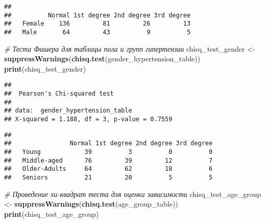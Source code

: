 \documentclass[
]{article}
\newenvironment{Shaded}{\begin{snugshade}}{\end{snugshade}}
\newcommand{\CommentTok}[1]{\textcolor[rgb]{0.56,0.35,0.01}{\textit{#1}}}
\newcommand{\FunctionTok}[1]{\textcolor[rgb]{0.13,0.29,0.53}{\textbf{#1}}}
\newcommand{\NormalTok}[1]{#1}
\newcommand{\OtherTok}[1]{\textcolor[rgb]{0.56,0.35,0.01}{#1}}
\newcommand{\SpecialCharTok}[1]{\textcolor[rgb]{0.81,0.36,0.00}{\textbf{#1}}}
\begin{document}
\begin{verbatim}
##         
##          Normal 1st degree 2nd degree 3rd degree
##   Female    136         81         26         13
##   Male       64         43          9          5
\end{verbatim}

\begin{Shaded}
\begin{Highlighting}[]
\CommentTok{\# Теста Фишера для таблицы пола и групп гипертензии}
\NormalTok{chisq\_test\_gender }\OtherTok{\textless{}{-}} \FunctionTok{suppressWarnings}\NormalTok{(}\FunctionTok{chisq.test}\NormalTok{(gender\_hypertension\_table))}
\FunctionTok{print}\NormalTok{(chisq\_test\_gender)}
\end{Highlighting}
\end{Shaded}

\begin{verbatim}
## 
##  Pearson's Chi-squared test
## 
## data:  gender_hypertension_table
## X-squared = 1.188, df = 3, p-value = 0.7559
\end{verbatim}

\begin{Shaded}
\end{Shaded}

\begin{verbatim}
##               
##                Normal 1st degree 2nd degree 3rd degree
##   Young            39          3          0          0
##   Middle-aged      76         39         12          7
##   Older-Adults     64         62         18          6
##   Seniors          21         20          5          5
\end{verbatim}

\begin{Shaded}
\begin{Highlighting}[]
\CommentTok{\# Проведение хи{-}квадрат теста для оценки зависимости}
\NormalTok{chisq\_test\_age\_group }\OtherTok{\textless{}{-}} \FunctionTok{suppressWarnings}\NormalTok{(}\FunctionTok{chisq.test}\NormalTok{(age\_group\_table))}
\FunctionTok{print}\NormalTok{(chisq\_test\_age\_group)}
\end{Highlighting}
\end{Shaded}
\end{document}
